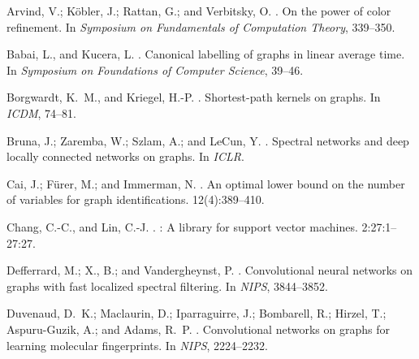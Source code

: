 \documentclass[letterpaper]{article}
\theoremstyle{definition}
\begin{document}
\fontsize{9.5pt}{10.5pt} \selectfont

\begin{thebibliography}{}
	
	Arvind, V.; K{\"{o}}bler, J.; Rattan, G.; and Verbitsky, O.
	.
	\newblock On the power of color refinement.
	\newblock In {\em Symposium on Fundamentals of Computation Theory},  339--350.
	
	Babai, L., and Kucera, L.
	.
	\newblock Canonical labelling of graphs in linear average time.
	\newblock In {\em Symposium on Foundations of Computer Science},  39--46.
	
	Borgwardt, K.~M., and Kriegel, H.-P.
	.
	\newblock Shortest-path kernels on graphs.
	\newblock In {\em ICDM},  74--81.
	
	Bruna, J.; Zaremba, W.; Szlam, A.; and LeCun, Y.
	.
	\newblock Spectral networks and deep locally connected networks on graphs.
	\newblock In {\em ICLR}.
	
	Cai, J.; F{\"{u}}rer, M.; and Immerman, N.
	.
	\newblock An optimal lower bound on the number of variables for graph
	identifications.
	 12(4):389--410.
	
	Chang, C.-C., and Lin, C.-J.
	.
	: {A} library for support vector machines.
	2:27:1--27:27.
	
	Defferrard, M.; X., B.; and Vandergheynst, P.
	.
	\newblock Convolutional neural networks on graphs with fast localized spectral
	filtering.
	\newblock In {\em NIPS},  3844--3852.
	
	Duvenaud, D.~K.; Maclaurin, D.; Iparraguirre, J.; Bombarell, R.; Hirzel, T.;
	Aspuru-Guzik, A.; and Adams, R.~P.
	.
	\newblock Convolutional networks on graphs for learning molecular fingerprints.
	\newblock In {\em NIPS},  2224--2232.
	

\end{thebibliography}
\end{document}
